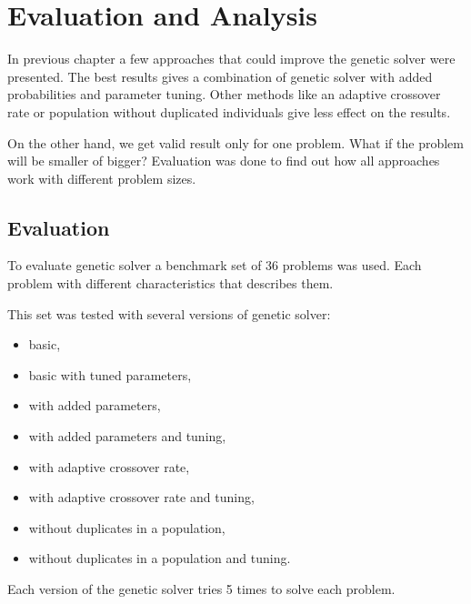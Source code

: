 \chapter{Evaluation and Analysis}

In previous chapter a few approaches that could improve the genetic solver were presented.
The best results gives a combination of genetic solver with added probabilities and parameter tuning.
Other methods like an adaptive crossover rate or population without duplicated individuals give less effect on the results.

On the other hand, we get valid result only for one problem. What if the problem will be smaller of bigger?
Evaluation was done to find out how all approaches work with different problem sizes. 
\section{Evaluation}
To evaluate genetic solver a benchmark set of 36 problems was used.
Each problem with different characteristics that describes them.

This set was tested with several versions of genetic solver:
\begin{itemize}
	\item basic,
	\item basic with tuned parameters,
	\item with added parameters,
	\item with added parameters and tuning,
	\item with adaptive crossover rate,
	\item with adaptive crossover rate and tuning,
	\item without duplicates in a population,
	\item without duplicates in a population and tuning.
\end{itemize}

Each version of the genetic solver tries 5 times to solve each problem.

